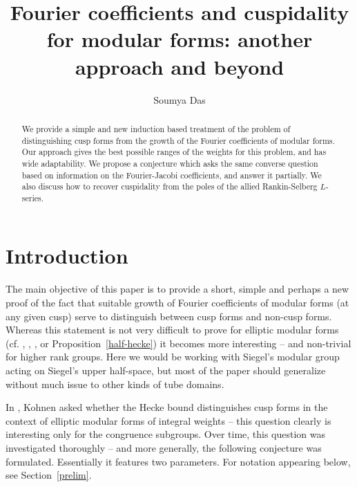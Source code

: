 \documentclass[12pt]{amsart}
\numberwithin{equation}{section}
\theoremstyle{plain}
\newcommand{\propref}[1]{Proposition~\ref{#1}}
\theoremstyle{definition}
\begin{document}
\title[Fourier coefficients and cuspidality]{Fourier coefficients and cuspidality for modular forms: another approach and beyond}



\author{Soumya Das}
\address{Department of Mathematics\\ 
Indian Institute of Science\\ 
Bangalore -- 560012, India \\.}


\date{}


\begin{abstract}
We provide a simple and new induction based treatment of the problem of distinguishing cusp forms from the growth of the Fourier coefficients of modular forms. Our approach  gives the best possible ranges of the weights for this problem, and has wide adaptability. We propose a conjecture which asks the same converse question based on information on the Fourier-Jacobi coefficients, and answer it partially.
We also discuss how to recover cuspidality from the poles of the allied Rankin-Selberg $L$-series.
\end{abstract}

\maketitle 

\section{Introduction}

The main objective of this paper is to provide a short, simple and perhaps a new proof of the fact that suitable growth of Fourier coefficients of modular forms (at any given cusp) serve to distinguish between cusp forms and non-cusp forms. Whereas this statement is not very difficult to prove for elliptic modular forms (cf. \cite{ko}, \cite{bo-das1}, \cite{bo-ko}, or \propref{half-hecke}) it becomes more interesting -- and non-trivial for higher rank groups. Here we would be working with Siegel's modular group acting on Siegel's upper half-space, but most of the paper should generalize without much issue to other kinds of tube domains.

In \cite{ko}, Kohnen asked whether the Hecke bound distinguishes cusp forms in the context of elliptic modular forms of integral weights -- this question clearly is interesting only for the congruence subgroups. Over time, this question was investigated thoroughly -- and more generally, the following conjecture was formulated. Essentially it features two parameters. For notation appearing below, see Section~\ref{prelim}.
\end{document}
